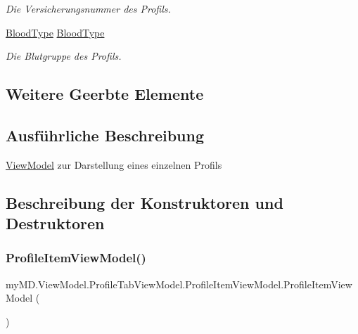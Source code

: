 \begin{DoxyCompactItemize}
\begin{DoxyCompactList}\small\item\em Die Versicherungsnummer des Profils. \end{DoxyCompactList}\item 
\mbox{\hyperlink{namespacemy_m_d_1_1_model_interface_1_1_data_model_interface_a5da1f31200b9d5cbc5d0704b8da3d17c}{Blood\+Type}} \mbox{\hyperlink{classmy_m_d_1_1_view_model_1_1_profile_tab_view_model_1_1_profile_item_view_model_a9c67eb1da84c7d284d533b89a0737859}{Blood\+Type}}
\begin{DoxyCompactList}\small\item\em Die Blutgruppe des Profils. \end{DoxyCompactList}\end{DoxyCompactItemize}
\subsection*{Weitere Geerbte Elemente}


\subsection{Ausführliche Beschreibung}
\mbox{\hyperlink{namespacemy_m_d_1_1_view_model}{View\+Model}} zur Darstellung eines einzelnen Profils 



\subsection{Beschreibung der Konstruktoren und Destruktoren}
\mbox{\label{classmy_m_d_1_1_view_model_1_1_profile_tab_view_model_1_1_profile_item_view_model_ae846bc0f8c6962ada62fa7f9a4640d1d}} 
\subsubsection{\texorpdfstring{Profile\+Item\+View\+Model()}{ProfileItemViewModel()}}
{\footnotesize\ttfamily my\+M\+D.\+View\+Model.\+Profile\+Tab\+View\+Model.\+Profile\+Item\+View\+Model.\+Profile\+Item\+View\+Model (\begin{DoxyParamCaption}{ }\end{DoxyParamCaption})}



